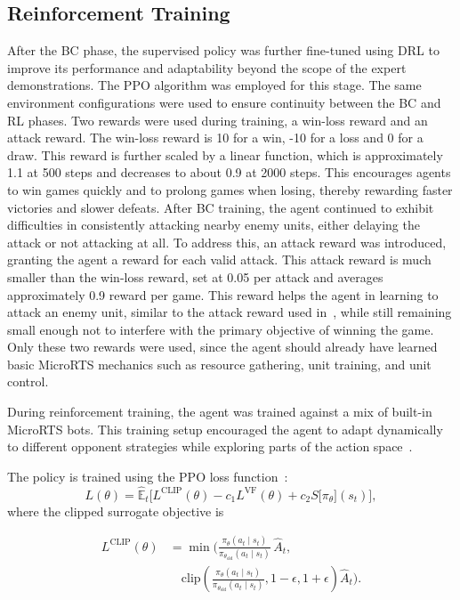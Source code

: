 \documentclass[10pt,twocolumn,letterpaper]{article}
\begin{document}
\subsection{Reinforcement Training}

After the BC phase, the supervised policy was further fine-tuned using DRL to improve its performance and adaptability beyond the scope of the expert demonstrations. The PPO algorithm was employed for this stage. The same environment configurations were used to ensure continuity between the BC and RL phases. Two rewards were used during training, a win-loss reward and an attack reward. The win-loss reward is 10 for a win, -10 for a loss and 0 for a draw. This reward is further scaled by a linear function, which is approximately 1.1 at 500 steps and decreases to about 0.9 at 2000 steps. This encourages agents to win games quickly and to prolong games when losing, thereby rewarding faster victories and slower defeats. After BC training, the agent continued to exhibit difficulties in consistently attacking nearby enemy units, either delaying the attack or not attacking at all. To address this, an attack reward was introduced, granting the agent a reward for each valid attack. This attack reward is much smaller than the win-loss reward, set at 0.05 per attack and averages approximately 0.9 reward per game. This reward helps the agent in learning to attack an enemy unit, similar to the  attack reward used in~\cite{goodfriend2024raisocketai}, while still remaining small enough not to interfere with the primary objective of winning the game. Only these two rewards were used, since the agent should already have learned basic MicroRTS mechanics such as resource gathering, unit training, and unit control.

During reinforcement training, the agent was trained against a mix of built-in MicroRTS bots. This training setup encouraged the agent to adapt dynamically to different opponent strategies while exploring parts of the action space~\cite{huang2021gym}.

The policy is trained using the PPO loss function~\cite{schulman2017ppo}:
\begin{equation*}
L(\theta) = \hat{\mathbb{E}}_t \Big[ 
    L^{\text{CLIP}}(\theta) 
    - c_1 L^{\text{VF}}(\theta) 
    + c_2 S\big[\pi_\theta\big](s_t) 
\Big],
\label{eq:ppo_total}
\end{equation*}
where the clipped surrogate objective is

\begin{align*}
L^{\text{CLIP}}(\theta) 
  &= \min \Bigg(
      \frac{\pi_\theta(a_t \mid s_t)}{\pi_{\theta_{\text{old}}}(a_t \mid s_t)} \, \hat{A}_t, \nonumber \\ 
  &\quad \text{clip}\!\left(
        \frac{\pi_\theta(a_t \mid s_t)}{\pi_{\theta_{\text{old}}}(a_t \mid s_t)}, 
        1 - \epsilon, 1 + \epsilon
    \right)\hat{A}_t
  \Bigg).
\end{align*}
\end{document}
